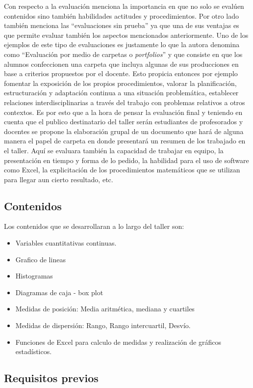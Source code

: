 Con respecto a la evaluación \textcite{crippa98} menciona la importancia en que no solo se evalúen contenidos sino también habilidades actitudes y procedimientos. Por otro lado también menciona las “evaluaciones sin prueba” ya que una de sus ventajas es que permite evaluar también los aspectos mencionados anteriormente. Uno de los ejemplos de este tipo de evaluaciones es justamente lo que la autora denomina como “Evaluación por medio de carpetas o \textit{portfolios}” y que consiste en que los alumnos confeccionen una carpeta que incluya algunas de sus producciones en base a criterios propuestos por el docente. Esto propicia entonces por ejemplo fomentar la exposición de los propios procedimientos, valorar la planificación, estructuración y adaptación continua a una situación problemática, establecer relaciones interdisciplinarias a través del trabajo con problemas relativos a otros contextos. Es por esto que a la hora de pensar la evaluación final y teniendo en cuenta que el publico destinatario del taller serán estudiantes de profesorados y docentes se propone la elaboración grupal de un documento que hará de alguna manera el papel de carpeta en donde presentará un resumen de los trabajado en el taller. Aquí se evaluara también la capacidad de trabajar en equipo, la presentación en tiempo y forma de lo pedido, la habilidad para el uso de software como Excel, la explicitación de los procedimientos matemáticos que se utilizan para llegar aun cierto resultado, etc.

\subsection{Contenidos}

Los contenidos que se desarrollaran a lo largo del taller son:
\begin{itemize}
	\item Variables cuantitativas continuas.
	\item Grafico de lineas
	\item Histogramas
	\item Diagramas de caja - box plot
	\item Medidas de posición: Media aritmética, mediana y cuartiles 
	\item Medidas de dispersión: Rango, Rango intercuartil, Desvío.
	\item Funciones de Excel para calculo de medidas y realización de gráficos estadísticos.
\end{itemize}

\subsection{Requisitos previos}

